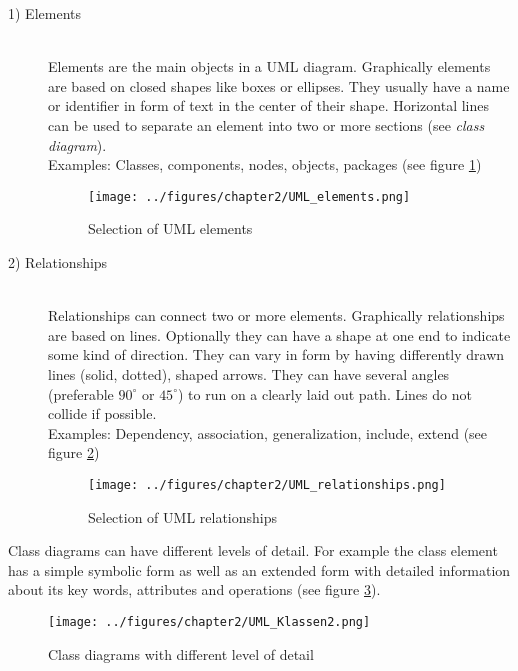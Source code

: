 \documentclass[twoside, openright, 12pt]{book}
\begin{document}
\begin{description}
\item[1) Elements]\hfill \\
Elements are the main objects in a UML diagram.
Graphically elements are based on closed shapes like boxes or ellipses.
They usually have a name or identifier in form of text in the center of their shape. Horizontal lines can be used to separate an element into two or more sections (see \textit{class diagram}). \\
Examples: Classes, components, nodes, objects, packages (see figure \ref{fig:UML_elements})

\begin{figure}[htb]
	\centering
	\texttt{[image: ../figures/chapter2/UML\_elements.png]}
	\caption{Selection of UML elements}
	\label{fig:UML_elements}
\end{figure}

\item[2) Relationships]\hfill \\
Relationships can connect two or more elements.
Graphically relationships are based on lines.
Optionally they can have a shape at one end to indicate some kind of direction.
They can vary in form by having differently drawn lines (solid, dotted), shaped arrows.
They can have several angles (preferable $90^{\circ}$ or $45^{\circ}$) to run on a clearly laid out path.
Lines do not collide if possible. \\
Examples: Dependency, association, generalization, include, extend (see figure \ref{fig:UML_relationships})

\begin{figure}[htb]
	\centering
	\texttt{[image: ../figures/chapter2/UML\_relationships.png]}
	\caption{Selection of UML relationships}
	\label{fig:UML_relationships}
\end{figure}
\end{description}

\noindent 
Class diagrams can have different levels of detail.
For example the class element has a simple symbolic form as well as an extended form with detailed information about its key words, attributes and operations (see figure \ref{fig:Class}).

\begin{figure}[htb]
	\centering
	\texttt{[image: ../figures/chapter2/UML\_Klassen2.png]}
	\caption{Class diagrams with different level of detail}
	\label{fig:Class}
\end{figure}
\end{document}

